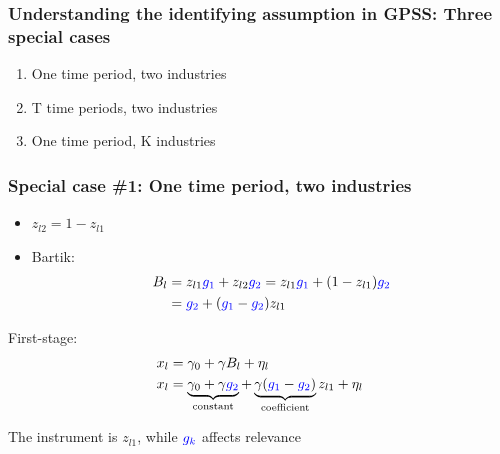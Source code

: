 \documentclass[notes,11pt, aspectratio=169]{beamer}
\begin{document}
\begin{frame}
\frametitle{Understanding the identifying assumption in GPSS: Three  special cases}

\begin{enumerate}
  \setlength\itemsep{1em}
\item One time period, two industries
\item T time periods, two industries
\item One time period, K industries
\end{enumerate}

\end{frame}



\begin{frame}[label=twoindustries]
\frametitle{Special case \#1: One time period, two industries}
\begin{itemize}
	\setlength\itemsep{1em}
\item $z_{l2}= 1-z_{l1}$ 
\item Bartik:  \begin{align*}B_l &= z_{l1} \textcolor{blue}{g_1} + z_{l2} \textcolor{blue}{g_2}  =z_{l1} \textcolor{blue}{g_1} + (1-z_{l1}) \textcolor{blue}{g_2} \notag \\
&=\textcolor{blue}{g_2}+ (\textcolor{blue}{g_1} - \textcolor{blue}{g_2}) z_{l1} \notag
\end{align*}
\end{itemize} 
First-stage:
\begin{align*}
x_l &= \gamma_0 + \gamma B_l + \eta_l \notag \\
x_l &= \underbrace{\gamma_0+\gamma \textcolor{blue}{g_2}}_{\text{constant}} + \underbrace{\gamma (\textcolor{blue}{g_1} - \textcolor{blue}{g_2})}_{\text{coefficient}} z_{l1} + \eta_l \notag 
\end{align*}

The instrument is $z_{l1}$, while $\textcolor{blue}{g_k}$ affects relevance

\hyperlink{whyolsisbiased}{}




\end{frame}
\end{document}
